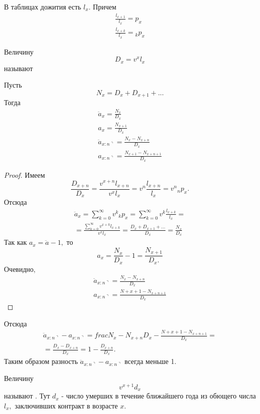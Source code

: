 В таблицах дожития есть $ l_x$. Причем
\begin{gather*}
	\frac{l_{x+1}}{l_x}=p_x\\
	\frac{l_{x+k}}{l_x}= {}_kp_x
\end{gather*}

\begin{definition}
	Величину 
	\[ D_x = v^xl_x \]
	называют 
\end{definition}
 
\begin{clair}
	Пусть 
	\[ N_x = D_x+D_{x+1}+...\]
	Тогда
	\begin{gather*}
		\ddot{a}_x = \frac{N_x}{D_x}\\
		a_x = \frac{N_{x+1}}{D_x}\\
		\ddot{a}_{x:n\urcorner}= \frac{N_x-N_{x+n}}{D_x}\\
		a_{x:n\urcorner} = \frac{N_{x+1}- N_{x+n+1}}{D_x}
	\end{gather*}
\end{clair}
\begin{proof}
	Имеем
	\[ \frac{D_{x+n}}{D_x}=\frac{v^{x+n}l_{x+n}}{v^xl_x}=v^n \frac{l_{x+n}}{l_x} = v^n{}_np_x .\]
	Отсюда
	\begin{gather*}
		\ddot{a}_x = \sum\limits_{k=0}^{\infty}v^k{}_kp_x = \sum\limits_{k=0}^{\infty}v^k \frac{l_{x+k}}{l_x}=\\
		=\frac{\sum\limits_{k=0}^{\infty}v^{x+k}l_{x+k}}{v^xl_x} = \frac{ D_x+D_{x+1}+...}{ D_x}=\frac{N_x}{D_x}
	\end{gather*}
	Так как $ a_x= \ddot{a}-1, $ то
	\[ a_x = \frac{N_x}{D_x} -1= \frac{N_{x+1}}{D_x.} \]
	Очевидно, 
	\begin{gather*}
		\ddot{a}_{x:n\urcorner}=\frac{N_x - N_{x+n}}{D_x}\\
		a_{x:n\urcorner} = \frac{N+{x+1}-N_{x+n+1}}{D_x}		
	\end{gather*}
\end{proof}

Отсюда
\begin{gather*}
	\ddot{a}_{x:n\urcorner} - a_{x:n\urcorner} = frac{N_x - N_{x+n}}{D_x} - \frac{N+{x+1}-N_{x+n+1}}{D_x}=\\
	=\frac{D_x - D_{x+n}}{D_x}= 1 - \frac{D_{x+n}}{D_x}.
\end{gather*}
Таким образом разность $ \ddot{a}_{x:n\urcorner} - a_{x:n\urcorner}$ всегда меньше 1.
\begin{definition}
	Величину 
	\[ v^{x+1}d_x\]
	называют . Тут $ d_x$ - число умерших в течение ближайшего года из обющего числа $ l_x,$ заключивших контракт в возрасте $ x.$
\end{definition}

